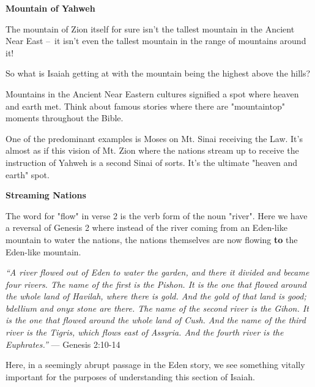 \documentclass[11pt]{article}
\begin{document}
\newpage
{\large\bfseries Mountain of Yahweh}
\vspace{1em}

The mountain of Zion itself for sure isn't the tallest mountain in the Ancient Near East – it isn't even the tallest mountain in the range of mountains around it!

\vspace{1em}
So what is Isaiah getting at with the mountain being the highest above the hills?

\vspace{1em}

Mountains in the Ancient Near Eastern cultures signified a spot where heaven and earth met.
Think about famous stories where there are "mountaintop" moments throughout the Bible.

\vspace{1em}
One of the predominant examples is Moses on Mt. Sinai receiving the Law. It's almost as if this vision
of Mt. Zion where the nations stream up to receive the instruction of Yahweh is a second Sinai of sorts.
It's the ultimate "heaven and earth" spot.

\vspace{3em}
{\large\bfseries Streaming Nations}
\vspace{1em}

The word for "flow" in verse 2 is the verb form of the noun "river".
Here we have a reversal of Genesis 2 where instead of the river coming from an Eden-like mountain to water the nations,
the nations themselves are now flowing \textbf{to} the Eden-like mountain.
\vspace{1em}

\textit{``A river flowed out of Eden to water the garden, and there it divided and became four rivers. The name of the first is the Pishon. It is the one that flowed around the whole land of Havilah, where there is gold. And the gold of that land is good; bdellium and onyx stone are there. The name of the second river is the Gihon. It is the one that flowed around the whole land of Cush. And the name of the third river is the Tigris, which flows east of Assyria. And the fourth river is the Euphrates.''} — Genesis 2:10-14
\vspace{1em}

Here, in a seemingly abrupt passage in the Eden story, we see something vitally important for the purposes of understanding this section of Isaiah.
\vspace{1em}
\end{document}
